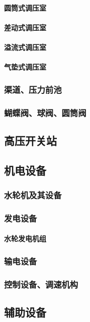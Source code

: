 \documentclass[UTF8]{../../ApplicationUniverse}
\begin{document}
            \paragraph{圆筒式调压室}
            \paragraph{差动式调压室}
            \paragraph{溢流式调压室}
            \paragraph{气垫式调压室}
        \subsubsection{渠道、压力前池}
        \subsubsection{蝴蝶阀、球阀、圆筒阀}
    \subsection{高压开关站}
    \subsection{机电设备}
        \subsubsection{水轮机及其设备}
        \subsubsection{发电设备}
            \paragraph{水轮发电机组}
        \subsubsection{输电设备}
        \subsubsection{控制设备、调速机构}
    \subsection{辅助设备}
\end{document}
